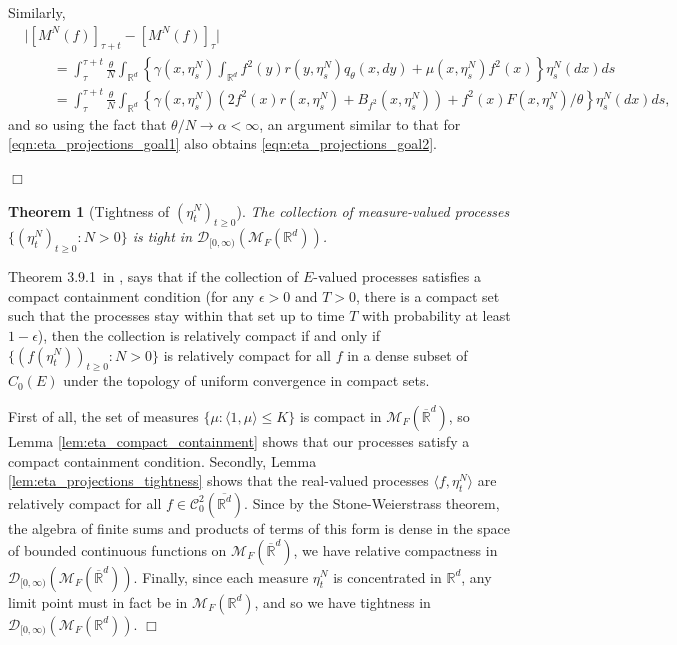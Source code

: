 \documentclass[12pt]{article}
\newenvironment {proof}{{\noindent\bf Proof }}{\hfill $\Box$ \medskip}
\newtheorem{theorem}{Theorem}[section]
\newcommand{\IR}{\mathbb R}
\newcommand{\measures}{\mathcal{M}_F(\IR^d)} %
\newcommand{\cmeasures}{\mathcal{M}_F(\overline{\IR}^d)} %
\begin{document}
\begin{proof}
Similarly,
\begin{align*}
    &
    \big| [M^{N}(f)]_{\tau + t} 
        - [M^{N}(f)]_\tau \big|
    \\ & \qquad =
    \int_{\tau}^{\tau + t}
        \frac{\theta}{N}
        \int_{\IR^d}
        \left\{
            \gamma(x, \eta^N_s)
            \int_{\IR^d} f^2(y) r(y, \eta^N_s) q_\theta(x, dy)
            +
            \mu(x, \eta^N_s) f^2(x)
        \right\}
        \eta^N_s(dx)
    ds 
    \\ & \qquad =
    \int_{\tau}^{\tau + t}
        \frac{\theta}{N}
        \int_{\IR^d}
        \left\{
            \gamma(x, \eta^N_s)
            \left(
                2 f^2(x) r(x, \eta^N_s)
                +
                B_{f^2}(x, \eta^N_s)
            \right)
            +
            f^2(x) F(x, \eta^N_s) / \theta
        \right\}
        \eta^N_s(dx)
    ds ,
\end{align*}
and so using the fact that $\theta/N \to \alpha < \infty$,
an argument similar to 
that for \eqref{eqn:eta_projections_goal1}
also obtains \eqref{eqn:eta_projections_goal2}.

\end{proof}

\begin{theorem}[Tightness of $(\eta^{N}_t)_{t \geq 0}$]
    The collection of measure-valued processes 
    $\{(\eta^{N}_t)_{t \geq 0}: N > 0\}$
    is tight in $\mathcal{D}_{[0,\infty)}(\measures)$.
\end{theorem}

\begin{proof}
    Theorem 3.9.1~in \cite{EK},
    says that if the collection of $E$-valued processes
    satisfies a compact containment condition
    (for any $\epsilon > 0$ and $T>0$, there is a compact set
    such that the processes stay within that set up to time $T$ with probability at least $1-\epsilon$),
    then the collection is relatively compact
    if and only if
    $\{(f(\eta^{N}_t))_{t \geq 0}: N > 0\}$ is relatively compact
    for all $f$ in a dense subset of $C_0(E)$
    under the topology of uniform convergence in compact sets.

    First of all,
    the set of measures $\{ \mu: \langle 1, \mu \rangle \leq K \} $ is compact in $\cmeasures$,
    so Lemma \ref{lem:eta_compact_containment}
    shows that our processes satisfy a compact containment condition.
    Secondly, Lemma \ref{lem:eta_projections_tightness}
    shows that the real-valued processes $\langle f, \eta^{N}_t \rangle$
    are relatively compact for all $f \in \mathcal{C}^{2}_{0}(\overline{\IR^d})$.
    Since by the Stone-Weierstrass theorem,
    the algebra of finite sums and products of terms of this form
    is dense in the space of bounded continuous functions on $\cmeasures$,
    we have relative compactness in $\mathcal{D}_{[0,\infty)}(\cmeasures)$.
    Finally,
    since each measure $\eta^{N}_t$ is concentrated in $\IR^d$,
    any limit point must in fact be in $\measures$,
    and so we have 
    tightness in $\mathcal{D}_{[0,\infty)}(\measures)$.
\end{proof}
\end{document}
